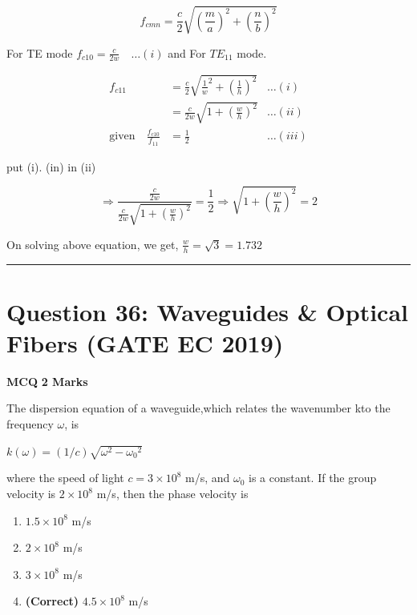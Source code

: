 \documentclass[11pt,a4paper]{article}
\begin{document}
\begin{tcolorbox}[solbox, title=Detailed Solution -- Question 35]
\[
f_{c m n}=\frac{c}{2} \sqrt{\left(\frac{m}{a}\right)^{2}+\left(\frac{n}{b}\right)^{2}}
\]

 For TE mode
$f_{c10}=\frac{c}{2 w} \quad\ldots(i)$
 and For $TE_{11}$ mode.

\[
\begin{aligned} f_{c11} &=\frac{c}{2} \sqrt{\frac{1}{w}^{2}+\left(\frac{1}{h}\right)^{2}} &\ldots(i)\\ &=\frac{c}{2 w} \sqrt{1+\left(\frac{w}{h}\right)^{2}} &\ldots(ii)\\ \text{given}\quad\frac{f_{c10}}{f_{11}} &=\frac{1}{2} &\ldots(iii) \end{aligned}
\]

 put (i). (in) in (ii)

\[
\Rightarrow \frac{\frac{c}{2 w}}{\frac{c}{2 w} \sqrt{1+\left(\frac{w}{h}\right)^{2}}}=\frac{1}{2} \Rightarrow \sqrt{1+\left(\frac{w}{h}\right)^{2}}=2
\]

 On solving above equation, we get,
$\frac{w}{h}=\sqrt{3}=1.732$
\end{tcolorbox}

\vspace{1.5em}
\hrule
\vspace{1.5em}

\section*{Question 36: Waveguides \& Optical Fibers (GATE EC 2019)}
\noindent \textbf{\color{primary}MCQ} \hfill \textbf{\color{secondary}2 Marks}


\noindent The dispersion equation of a waveguide,which relates the wavenumber kto the frequency $\omega$, is 

$k(\omega) =(1/c)\sqrt{\omega ^2 -{\omega _0}^2}$

 where the speed of light $c=3 \times 10^8$ m/s, and $\omega_0$ is a constant.  If the group velocity is $2 \times 10^8$ m/s, then the phase velocity is


\begin{enumerate}[label=(\Alph*)]
    \item $1.5 \times 10^8$ m/s
    \item $2 \times 10^8$ m/s
    \item $3 \times 10^8$ m/s
    \item \textbf{(Correct)} $4.5 \times 10^8$ m/s
\end{enumerate}
\end{document}
